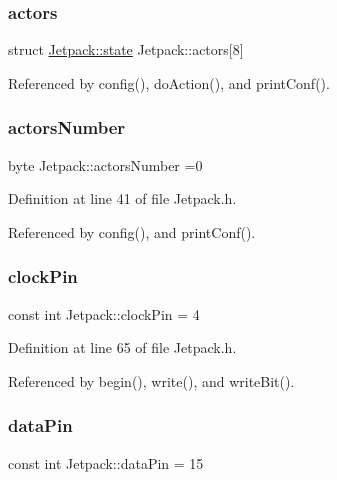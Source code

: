 \subsubsection{\texorpdfstring{actors}{actors}}
{\footnotesize\ttfamily struct \hyperlink{structJetpack_1_1state}{Jetpack\+::state} Jetpack\+::actors\mbox{[}8\mbox{]}\hspace{0.3cm}{\ttfamily [private]}}



Referenced by config(), do\+Action(), and print\+Conf().

\mbox{\label{classJetpack_a52c86319cb3f7f1ab744a64db18a7ba5}} 
\subsubsection{\texorpdfstring{actors\+Number}{actorsNumber}}
{\footnotesize\ttfamily byte Jetpack\+::actors\+Number =0\hspace{0.3cm}{\ttfamily [private]}}



Definition at line 41 of file Jetpack.\+h.



Referenced by config(), and print\+Conf().

\mbox{\label{classJetpack_a58ebb991f358f3ae94e82148b0221b5a}} 
\subsubsection{\texorpdfstring{clock\+Pin}{clockPin}}
{\footnotesize\ttfamily const int Jetpack\+::clock\+Pin = 4\hspace{0.3cm}{\ttfamily [private]}}



Definition at line 65 of file Jetpack.\+h.



Referenced by begin(), write(), and write\+Bit().

\mbox{\label{classJetpack_a3d669a56e93c71dd25f970d4ed7d0c00}} 
\subsubsection{\texorpdfstring{data\+Pin}{dataPin}}
{\footnotesize\ttfamily const int Jetpack\+::data\+Pin = 15\hspace{0.3cm}{\ttfamily [private]}}



